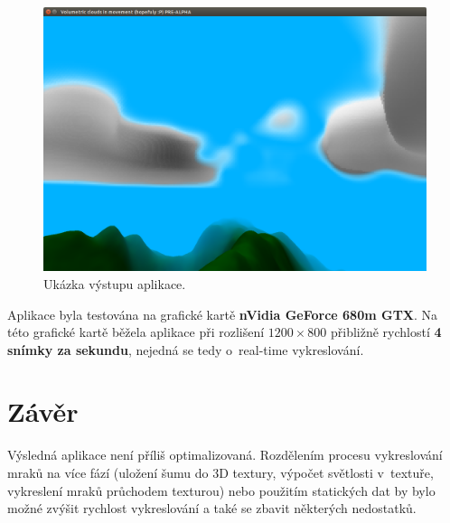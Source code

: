 \documentclass[a4paper, 12pt]{article}
\begin{document}
\begin{figure}
  \centering
  \includegraphics[width=15cm,keepaspectratio]{img/PGP-Clouds-01}
  \caption{Ukázka výstupu aplikace.}
  \label{fig:app-demo}
\end{figure}

Aplikace byla testována na grafické kartě \textbf{nVidia GeForce 680m GTX}.
Na této grafické kartě běžela aplikace při rozlišení $1200 \times 800$ přibližně
rychlostí \textbf{4 snímky za sekundu}, nejedná se tedy o~real-time vykreslování.


\section{Závěr}


Výsledná aplikace není příliš optimalizovaná. Rozdělením procesu vykreslování
mraků na více fází (uložení šumu do 3D textury, výpočet světlosti v~textuře,
vykreslení mraků průchodem texturou) nebo použitím statických dat by bylo možné
zvýšit rychlost vykreslování a také se zbavit některých nedostatků.

\nocite{url:clouds-wakapon}


\begin{flushleft}
  
\end{flushleft}

\end{document}
